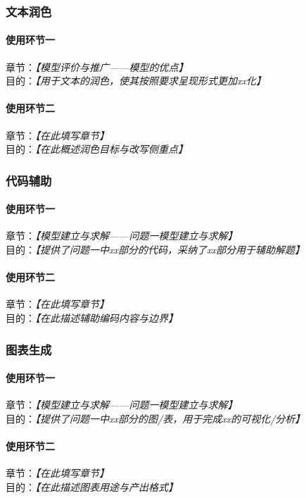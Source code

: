 \documentclass[12pt]{ctexart}
\newcommand{\ph}[1]{\textit{【#1】}}
\begin{document}
\subsubsection{文本润色}
\paragraph{使用环节一}
章节：\ph{模型评价与推广——模型的优点} \\
目的：\ph{用于文本的润色，使其按照要求呈现形式更加xx化}

\paragraph{使用环节二}
章节：\ph{在此填写章节} \\
目的：\ph{在此概述润色目标与改写侧重点}

\subsubsection{代码辅助}
\paragraph{使用环节一}
章节：\ph{模型建立与求解——问题一模型建立与求解} \\
目的：\ph{提供了问题一中xx部分的代码，采纳了xx部分用于辅助解题}

\paragraph{使用环节二}
章节：\ph{在此填写章节} \\
目的：\ph{在此描述辅助编码内容与边界}

\subsubsection{图表生成}
\paragraph{使用环节一}
章节：\ph{模型建立与求解——问题一模型建立与求解} \\
目的：\ph{提供了问题一中xx部分的图/表，用于完成xx的可视化/分析}

\paragraph{使用环节二}
章节：\ph{在此填写章节} \\
目的：\ph{在此描述图表用途与产出格式}
\end{document}
